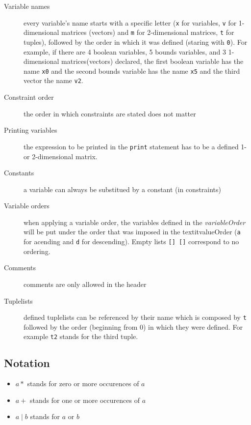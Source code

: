 \documentclass{article}
\begin{document}
\begin{small}
\begin{description}
  \item[Variable names]  every variable's name starts with a specific letter 
  (\texttt{x} for variables, \texttt{v} for 1-dimensional matrices
  (vectors) and \texttt{m} for 2-dimensional matrices, \texttt{t} for
  tuples), followed by
   the order in which it was defined  (staring with \texttt{0}). 
  For example, if there are 4 boolean variables, 5 bounds variables,
  and 3 1-dimensional matrices(vectors) declared, 
  the first boolean variable has the name \texttt{x0} and the second
  bounds variable has the name \texttt{x5} and the third vector the
  name \texttt{v2}.  
  \item[Constraint order] the order in which constraints are stated does not matter
  \item[Printing variables] the expression to be printed in the \texttt{print} statement
  has to be a defined 1- or 2-dimensional matrix.    
  \item[Constants] a variable can always be substitued by a constant (in constraints)
  \item[Variable orders] when applying a variable order, the variables defined in the
  \textit{variableOrder} will be put under the order  that was imposed in the
  textit{valueOrder} (\texttt{a} for acending
  and \texttt{d} for descending). Empty lists \texttt{[] []} correspond to no ordering.
  \item[Comments] comments are only allowed in the header
  \item[Tuplelists] defined tuplelists can be referenced by their name which is
  composed by \texttt{t} followed by the order (beginning from 0) in which they were
  defined. For example \texttt{t2} stands for the third tuple.  
\end{description}



\subsection{Notation}
 
\begin{center}
\begin{itemize}
  \item $a *$ stands for zero or more occurences of $a$
  \item $a +$ stands for one or more occurences of $a$
  \item $a \mid b$ stands for $a$ or $b$

\end{itemize}
\end{center}


\end{small}
\end{document}
